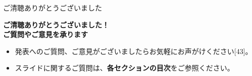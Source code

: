 \documentclass[unicode,12pt,aspectratio=169,dvipdfmx]{beamer}
\begin{document}
\begin{frame}{ご清聴ありがとうございました}
    \begin{center}
        \Large \textbf{ご清聴ありがとうございました！} \\
        \vspace{1cm}
        \Large \textbf{ご質問やご意見を承ります}
    \end{center}
    \vspace{0.5cm}
    \begin{itemize}
        \item 発表へのご質問、ご意見がございましたらお気軽にお声がけください[43]。
        \item スライドに関するご質問は、\textbf{各セクションの目次}をご参照ください。
    \end{itemize}
\end{frame}
\end{document}
